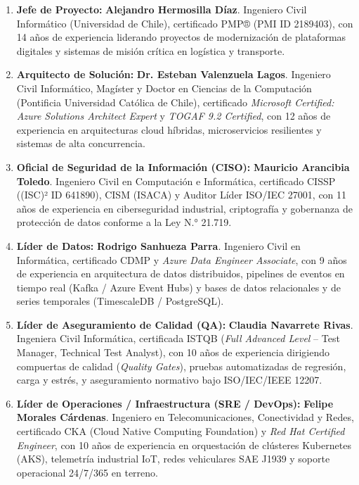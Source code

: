 \begin{enumerate}
  \item \textbf{Jefe de Proyecto:} \textbf{Alejandro Hermosilla Díaz}. Ingeniero Civil Informático (Universidad de Chile), certificado PMP® (PMI ID 2189403), con 14 años de experiencia liderando proyectos de modernización de plataformas digitales y sistemas de misión crítica en logística y transporte.
  \item \textbf{Arquitecto de Solución:} \textbf{Dr. Esteban Valenzuela Lagos}. Ingeniero Civil Informático, Magíster y Doctor en Ciencias de la Computación (Pontificia Universidad Católica de Chile), certificado \textit{Microsoft Certified: Azure Solutions Architect Expert} y \textit{TOGAF 9.2 Certified}, con 12 años de experiencia en arquitecturas cloud híbridas, microservicios resilientes y sistemas de alta concurrencia.
  \item \textbf{Oficial de Seguridad de la Información (CISO):} \textbf{Mauricio Arancibia Toledo}. Ingeniero Civil en Computación e Informática, certificado CISSP ((ISC)² ID 641890), CISM (ISACA) y Auditor Líder ISO/IEC 27001, con 11 años de experiencia en ciberseguridad industrial, criptografía y gobernanza de protección de datos conforme a la Ley N.° 21.719.
  \item \textbf{Líder de Datos:} \textbf{Rodrigo Sanhueza Parra}. Ingeniero Civil en Informática, certificado CDMP y \textit{Azure Data Engineer Associate}, con 9 años de experiencia en arquitectura de datos distribuidos, pipelines de eventos en tiempo real (Kafka / Azure Event Hubs) y bases de datos relacionales y de series temporales (TimescaleDB / PostgreSQL).
  \item \textbf{Líder de Aseguramiento de Calidad (QA):} \textbf{Claudia Navarrete Rivas}. Ingeniera Civil Informática, certificada ISTQB (\textit{Full Advanced Level} -- Test Manager, Technical Test Analyst), con 10 años de experiencia dirigiendo compuertas de calidad (\textit{Quality Gates}), pruebas automatizadas de regresión, carga y estrés, y aseguramiento normativo bajo ISO/IEC/IEEE 12207.
  \item \textbf{Líder de Operaciones / Infraestructura (SRE / DevOps):} \textbf{Felipe Morales Cárdenas}. Ingeniero en Telecomunicaciones, Conectividad y Redes, certificado CKA (Cloud Native Computing Foundation) y \textit{Red Hat Certified Engineer}, con 10 años de experiencia en orquestación de clústeres Kubernetes (AKS), telemetría industrial IoT, redes vehiculares SAE J1939 y soporte operacional 24/7/365 en terreno.
\end{enumerate}

